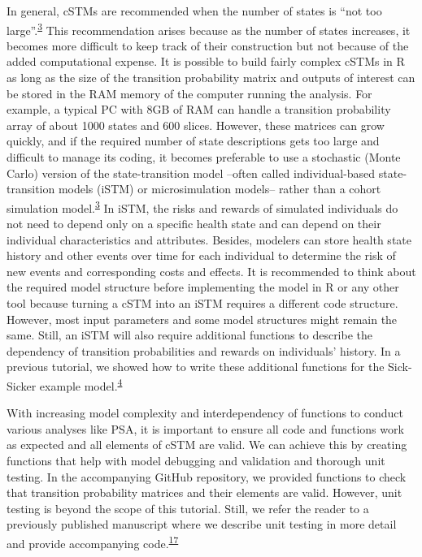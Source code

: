 \documentclass[
]{article}
\begin{document}
In general, cSTMs are recommended when the number of states is ``not too large''.\textsuperscript{\protect\hyperlink{ref-Siebert2012c}{3}} This recommendation arises because as the number of states increases, it becomes more difficult to keep track of their construction but not because of the added computational expense. It is possible to build fairly complex cSTMs in R as long as the size of the transition probability matrix and outputs of interest can be stored in the RAM memory of the computer running the analysis. For example, a typical PC with 8GB of RAM can handle a transition probability array of about 1000 states and 600 slices. However, these matrices can grow quickly, and if the required number of state descriptions gets too large and difficult to manage its coding, it becomes preferable to use a stochastic (Monte Carlo) version of the state-transition model --often called individual-based state-transition models (iSTM) or microsimulation models-- rather than a cohort simulation model.\textsuperscript{\protect\hyperlink{ref-Siebert2012c}{3}} In iSTM, the risks and rewards of simulated individuals do not need to depend only on a specific health state and can depend on their individual characteristics and attributes. Besides, modelers can store health state history and other events over time for each individual to determine the risk of new events and corresponding costs and effects. It is recommended to think about the required model structure before implementing the model in R or any other tool because turning a cSTM into an iSTM requires a different code structure. However, most input parameters and some model structures might remain the same. Still, an iSTM will also require additional functions to describe the dependency of transition probabilities and rewards on individuals' history. In a previous tutorial, we showed how to write these additional functions for the Sick-Sicker example model.\textsuperscript{\protect\hyperlink{ref-Krijkamp2018}{4}}

With increasing model complexity and interdependency of functions to conduct various analyses like PSA, it is important to ensure all code and functions work as expected and all elements of cSTM are valid. We can achieve this by creating functions that help with model debugging and validation and thorough unit testing. In the accompanying GitHub repository, we provided functions to check that transition probability matrices and their elements are valid. However, unit testing is beyond the scope of this tutorial. Still, we refer the reader to a previously published manuscript where we describe unit testing in more detail and provide accompanying code.\textsuperscript{\protect\hyperlink{ref-Alarid-Escudero2019e}{17}}
\end{document}
